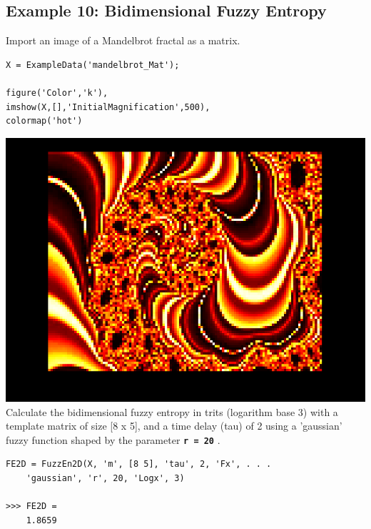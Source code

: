 \documentclass[12pt, a4paper, titlepage, openany]{book}
\begin{document}
\subsection{\normalsize Example 10: \hspace{15mm} Bidimensional Fuzzy Entropy}
\noindent Import an image of a Mandelbrot fractal as a matrix.
\begin{verbatim}
X = ExampleData('mandelbrot_Mat');

figure('Color','k'), 
imshow(X,[],'InitialMagnification',500),
colormap('hot')
\end{verbatim}
\includegraphics[scale=.4]{mandelbrot.png}\newline \newline
Calculate the bidimensional fuzzy entropy in trits (logarithm base 3) with a template matrix of size [8 x 5], and a time delay (tau) of 2  using a 'gaussian' fuzzy function shaped by the parameter \texttt{\textbf{r = 20}} .
\begin{verbatim}
FE2D = FuzzEn2D(X, 'm', [8 5], 'tau', 2, 'Fx', . . .
	'gaussian', 'r', 20, 'Logx', 3)

>>> FE2D = 
	1.8659
\end{verbatim}



\newpage
\end{document}
